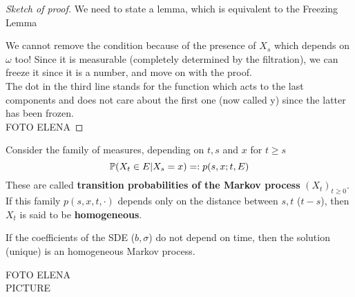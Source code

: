 \begin{ProofBox}
\begin{proof}[Sketch of proof]
        We need to state a lemma, which is equivalent to the Freezing Lemma
        \begin{PropBox}
            \begin{Lemma}
                
            \end{Lemma}
        \end{PropBox}
        We cannot remove the condition because of the presence of $X_s$ which depends on $\omega$ too!
        Since it is measurable (completely determined by the filtration), we can freeze it since it is a number, and move on with the proof. \\
        The dot in the third line stands for the function which acts to the last components and does not care about the first one (now called y) since the latter has been frozen. \\
        FOTO ELENA
    \end{proof}
\end{ProofBox}
Consider the family of measures, depending on $t,s$ and $x$ for $t \geq s$
\begin{equation*}
    \mathbb{P}(X_t \in E | X_s=x) =: p(s,x;t,E)
\end{equation*}
These are called \textbf{transition probabilities of the Markov process} $(X_t)_{t \geq 0}$. If this family $p(s,x,t,\cdot)$ depends only on the distance between $s,t$ ($t-s$), then $X_t$ is said to be \textbf{homogeneous}. 
\begin{PropBox}
    \begin{Cor}
        If the coefficients of the SDE ($b,\sigma$) do not depend on time, then the solution (unique) is an homogeneous Markov process. 
    \end{Cor}
\end{PropBox}
FOTO ELENA \\
PICTURE\\


